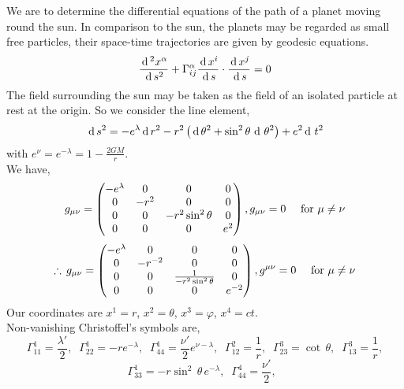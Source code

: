 \documentclass[../main-sheet.tex]{subfiles}
\begin{document}
    \begin{soln}
        We are to determine the differential equations of the path of a planet moving round the sun. In comparison to the sun, the planets may be regarded as small free particles, their space-time trajectories are given by geodesic equations.
        \begin{equation}
            \frac{\,\mathrm{d}\,^2 x^\alpha}{\,\mathrm{d}\, s^2}+\Gamma_{ij}^\alpha \frac{\,\mathrm{d}\, x^i}{\,\mathrm{d}\, s}\cdot \frac{\,\mathrm{d}\, x^j}{\,\mathrm{d}\, s}=0\label{eq:planet1}
        \end{equation}
        The field surrounding the sun may be taken as the field of an isolated particle at rest at the origin. So we consider the line element,
        \begin{equation}
            \,\mathrm{d}\, s^2=-e^\lambda\,\mathrm{d}\, r^2-r^2\left( \,\mathrm{d}\, \theta^2+\sin^2\theta\,\,\mathrm{d}\,\,\theta^2 \right)+e^2\,\mathrm{d}\,\,t^2
            \label{eq:planet2}
        \end{equation}
        with \(\displaystyle e^\nu=e^{-\lambda}=1-\frac{2GM}{r}\).\\
        We have,
        \[
            g_{\mu\nu}=\begin{pmatrix}
            -e^\lambda & 0 & 0& 0\\
            0 & -r^2 & 0& 0\\
            0& 0 & -r^2 \sin^2\theta & 0\\
            0& 0 & 0 & e^2
        \end{pmatrix},g_{{\mu\nu}}=0\quad\text{ for }\mu\neq \nu
        \]
        \[
            \therefore \,g_{\mu\nu}=\begin{pmatrix}
            -e^\lambda & 0 & 0& 0\\
            0 & -r^{-2} & 0& 0\\
            0& 0 & \frac{1}{-r^2 \sin^2\theta} & 0\\
            0& 0 & 0 & e^{-2}
        \end{pmatrix},g^{{\mu\nu}}=0\quad\text{ for }\mu\neq \nu
        \]
        Our coordinates are \(x^1=r\), \(x^2=\theta\), \(x^3=\varphi\), \(x^4=ct\).\\
        Non-vanishing Christoffel's symbols are,
        \[
            \Gamma_{11}^1=\frac{\lambda '}{2},\;\;
            \Gamma_{22}^1=-r e^{-\lambda},\;\;
            \Gamma_{44}^1=\frac{\nu '}{2}e^{\nu-\lambda},\;\;
            \Gamma_{12}^2=\frac{1}{r},\;\;
            \Gamma_{23}^3=\cot\,\theta,\;\;
            \Gamma_{13}^3=\frac{1}{r},\]\[
            \Gamma_{33}^1=-r \sin^2\,\theta\,e^{-\lambda},\;\;
            \Gamma_{44}^4=\frac{\nu'}{2},\;\;
\]
\end{soln}
\end{document}
